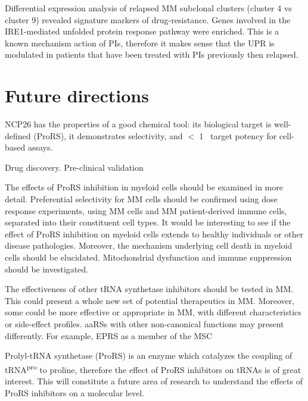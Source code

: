 Differential expression analysis of relapsed MM subclonal clusters (cluster 4 vs cluster 9) revealed signature markers of drug-resistance.
Genes involved in the IRE1-mediated unfolded protein response pathway were enriched.
This is a known mechanism action of PIs, therefore it makes sense that the UPR is modulated in patients that have been treated with PIs previously then relapsed.


\section{Future directions}
NCP26 has the properties of a good chemical tool: its biological target is well-defined (ProRS), it demonstrates selectivity, and $<$ 1\si{\micro\Molar} target potency for cell-based assays.

Drug discovery.
Pre-clinical validation

The effects of ProRS inhibition in myeloid cells should be examined in more detail.
Preferential selectivity for MM cells should be confirmed using dose response experiments, using MM cells and MM patient-derived immune cells, separated into their constituent cell types. %
It would be interesting to see if the effect of ProRS inhibition on myeloid cells extends to healthy individuals or other disease pathologies.
Moreover, the mechanism underlying cell death in myeloid cells should be elucidated.
Mitochondrial dysfunction and immune suppression should be investigated.

The effectiveness of other tRNA synthetase inhibitors should be tested in MM\@.
This could present a whole new set of potential therapeutics in MM\@.
Moreover, some could be more effective or appropriate in MM, with different characteristics or side-effect profiles.
aaRSs with other non-canonical functions may present differently.
For example, EPRS as a member of the MSC

Prolyl-tRNA synthetase (ProRS) is an enzyme which catalyzes the coupling of tRNA\textsuperscript{pro} to proline, therefore the effect of ProRS inhibitors on tRNAs is of great interest.
This will constitute a future area of research to understand the effects of ProRS inhibitors on a molecular level.


